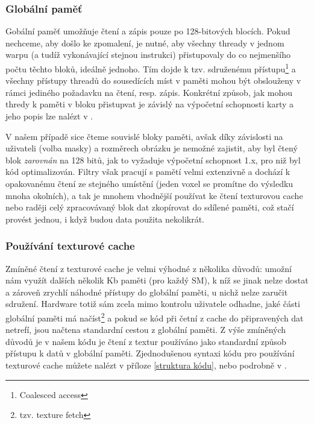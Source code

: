        \subsubsection{Globální paměť}
        
        Gobální paměť umožňuje čtení a zápis pouze po 128-bitových blocích. Pokud nechceme, aby došlo ke zpomalení, je nutné, aby všechny thready v jednom warpu (a tudíž vykonávající stejnou instrukci) přistupovaly do co nejmenšího počtu těchto bloků, ideálně jednoho. Tím dojde k tzv. sdruženému přístupu\footnote{Coalesced access} a všechny přístupy threadů do sousedících míst v paměti mohou být obslouženy v rámci jediného požadavku na čtení, resp. zápis. Konkrétní způsob, jak mohou thredy k paměti v bloku přistupvat je závislý na výpočetní schopnosti karty a jeho popis lze nalézt v \cite{CUDA programming g.}. 
        
        V našem případě sice čteme souvislé bloky paměti, avšak díky závislosti na uživateli (volba masky) a rozměrech obrázku je nemožné zajistit, aby byl čtený blok \emph{zarovnán} na 128 bitů, jak to vyžaduje výpočetní schopnost 1.x, pro niž byl kód optimalizován. Filtry však pracují s pamětí velmi extenzivně a dochází k opakovanému čtení ze stejného umístění (jeden voxel se promítne do výsledku mnoha okolních), a tak je mnohem vhodnější používat ke čtení texturovou cache nebo raději celý zpracovávaný blok dat zkopírovat do sdílené paměti, což stačí provést jednou, i když budou data použita nekolikrát.
        
        \subsubsection{Používání texturové cache}
        
        Zmíněné čtení z texturové cache je velmi výhodné z několika důvodů: umožní nám využít dalších několik Kb paměti (pro každý SM), k níž se jinak nelze dostat a zároveň zrychlí náhodné přístupy do globální paměti, u nichž nelze zaručit sdružení. Hardware totiž sám zcela mimo kontrolu uživatele odhadne, jaké části globální paměti má načíst\footnote{tzv. texture fetch} a pokud se kód při četní z cache do připravených dat netrefí, jsou načtena standardní cestou z globální paměti. Z výše zmíněných důvodů je v našem kódu je čtení z textur používáno jako standardní způsob přístupu k datů v globální paměti.
        Zjednodušenou syntaxi kódu pro používání texturové cache můžete nalézt v příloze \ref{struktura kódu}, nebo podrobně v \cite{CUDA programming g.}.

